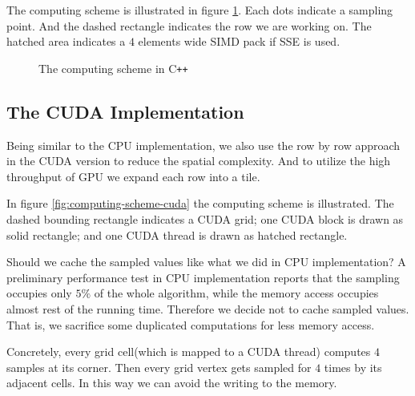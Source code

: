 \documentclass[a4paper,12pt]{article}
\begin{document}
The computing scheme is illustrated in figure \ref{fig:computing-scheme-cpp}.
Each dots indicate a sampling point.
And the dashed rectangle indicates the row we are working on.
The hatched area indicates a $4$ elements wide SIMD pack if SSE is used.

\begin{figure}[h]
\centering
{}
\caption{The computing scheme in C\texttt{++}}
\label{fig:computing-scheme-cpp}
\end{figure}

\subsection{The CUDA Implementation}

Being similar to the CPU implementation,
we also use the row by row approach in the CUDA version
to reduce the spatial complexity.
And to utilize the high throughput of GPU we expand each row into
a tile.

In figure \ref{fig:computing-scheme-cuda} the computing scheme is illustrated.
The dashed bounding rectangle indicates a CUDA grid;
one CUDA block is drawn as solid rectangle;
and one CUDA thread is drawn as hatched rectangle.

Should we cache the sampled values like what we did in CPU implementation?
A preliminary performance test in CPU implementation
reports that the sampling occupies only $5\%$ of the whole algorithm,
while the memory access occupies almost rest of the running time.
Therefore we decide not to cache sampled values.
That is, we sacrifice some duplicated computations for less memory access.

Concretely,
every grid cell(which is mapped to a CUDA thread)
computes $4$ samples at its corner.
Then every grid vertex gets sampled for $4$ times by its adjacent cells.
In this way we can avoid the writing to the memory.
\end{document}
